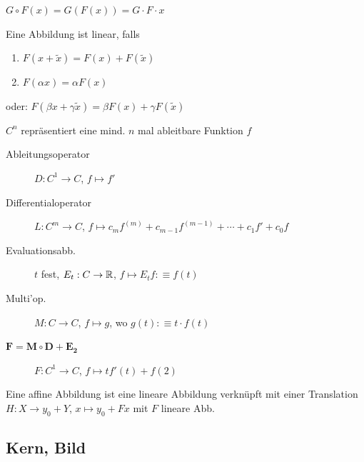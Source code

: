 \documentclass[a4paper,twocolumn]{article}
\begin{document}
	\begin{fmerke}
		$G \circ F(x) = G(F(x)) = G \cdot F \cdot x$ 
	\end{fmerke}
	
	\begin{fdef}
		Eine Abbildung ist linear, falls\\[-6mm]
		\begin{enumerate}
			\item $F(x + \tilde x) = F(x) + F(\tilde x)$\\[-6mm]
			\item $F(\alpha x) = \alpha F(x)$\\[-5mm]
		\end{enumerate}
		oder:
		$F(\beta x + \gamma \tilde x) = \beta F(x) + \gamma F(\tilde x)$
	\end{fdef}
	
	\begin{fdef}
		$C^n$ repräsentiert eine mind. $n$ mal ableitbare Funktion $f$ \\[-6mm]
		\begin{description}
			\item[Ableitungsoperator] $D:C^1 \rightarrow C$, $f \mapsto f'$\\[-6mm]
			\item[Differentialoperator] $L:C^m \rightarrow C$, $f \mapsto c_m f^{(m)} + c_{m-1} f^{(m-1)} + \cdots
										+ c_1 f' + c_0 f$
			\item[Evaluationsabb.] $t$ fest, $E_t:C \rightarrow \mathbb{R}$, $f \mapsto E_t f :\equiv f(t)$
			\item[Multi'op.] $M:C \rightarrow C$, $f \mapsto g$, wo $g(t) :\equiv t \cdot f(t)$
			\item[$\mathbf{F = M \circ D + E_2}$] $F:C^1 \rightarrow C$, $f \mapsto t f'(t) + f(2)$
		\end{description}
	\end{fdef}

	\begin{fdef}
		Eine affine Abbildung ist eine lineare Abbildung verknüpft mit einer Translation\\
		$H:X \rightarrow y_0 + Y$, $x \mapsto y_0 + Fx$ mit $F$ lineare Abb.
	\end{fdef}
	
	\subsection{Kern, Bild}
	
\end{document}
